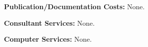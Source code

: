 \documentclass[11pt]{article}
\begin{document}
{\bf Publication/Documentation Costs:} None.


{\bf Consultant Services:} None.


{\bf Computer Services:} None.
\end{document}
